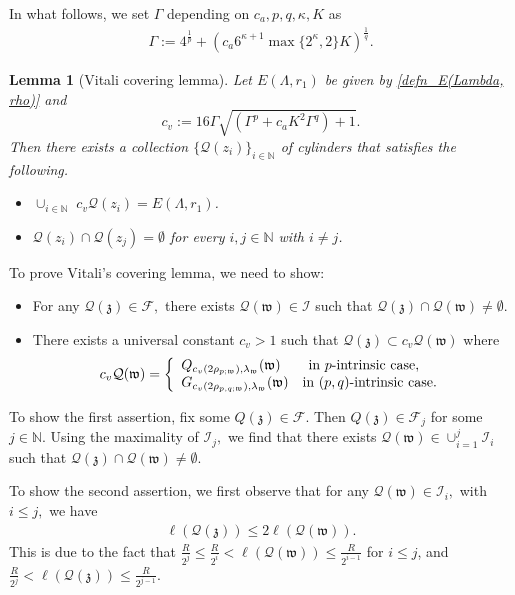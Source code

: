\documentclass[notitlepage,11pt,reqno]{amsart}
\newtheorem{lemma}[theorem]{Lemma}
\theoremstyle{definition}
\numberwithin{equation}{section}
\newcommand{\mcf}{\mathcal{F}}
\newcommand{\La}{\Lambda}
\newcommand{\NN}{\mathds{N}}
\begin{document}
In what follows, we set $\Gamma$ depending on $c_a, p, q, \kappa, K$ as 
\begin{align*}
   \Gamma:= 4^{\frac{1}{p}}+\left(c_a6^{\kappa+1}\max\{2^{\kappa}, 2\}K\right)^{\frac{1}{q}}.
\end{align*}
\begin{lemma}[Vitali covering lemma]\label{vitali lemma}
 Let $E(\Lambda, r_1)$ be given by \eqref{defn_E(Lambda, rho)} and $$c_v:= 16\Gamma \sqrt{(\Gamma^p+c_aK^2 \Gamma^q)+1}.$$ Then there exists a collection $\{\mathcal{Q}({z_i})\}_{i\in \NN}$ of cylinders that satisfies the following.
\begin{itemize}
\item [(i)] $\cup_{i\in\NN}\,\,c_v \mathcal{Q}({z_i})=E(\La, r_1)$.
\item[(ii)] $\mathcal{Q}({z_i})\cap \mathcal{Q}({z_j})= \emptyset$ for every $i,j\in \NN$ with $i\ne j$.
\end{itemize}   
\end{lemma}
To prove Vitali's covering lemma, we need to show:
\begin{itemize}
\item[(i)] For any $\mathcal{Q}(\mathfrak{z}) \in \mcf,$ there exists $\mathcal{Q}(\mathfrak{w}) \in \mathcal{I}$ such that $\mathcal{Q}(\mathfrak{z}) \cap \mathcal{Q}(\mathfrak{w}) \neq \emptyset.$
\item[(ii)] There exists a universal constant $c_v>1$ such that $\mathcal{Q}(\mathfrak{z}) \subset c_v \mathcal{Q}(\mathfrak{w})$ where 
$$
c_v\mathcal{Q}(\mathfrak{w})=\left\{
    \begin{array}{l c}
        Q_{c_v(2\rho_{p;\mathfrak{w}}),\lambda_\mathfrak{w}}(\mathfrak{w})\,\,\,\,\,\, \quad \text{in $p$-intrinsic case},\\
        G_{c_v(2\rho_{p,q;\mathfrak{w}}),\lambda_\mathfrak{w}}(\mathfrak{w}) \quad \text{in $(p,q)$-intrinsic case}.
    \end{array}
    \right.
$$
\end{itemize}
To show the first assertion, fix some $Q(\mathfrak{z}) \in \mcf.$ Then $Q(\mathfrak{z}) \in \mcf_j$ for some $j \in \NN.$ Using the maximality of $\mathcal{I}_j,$ we find that there exists $\mathcal{Q}(\mathfrak{w})\in \cup_{i=1}^{j}\mathcal{I}_i$ such that $\mathcal{Q}(\mathfrak{z})\cap \mathcal{Q}(\mathfrak{w})\neq \emptyset.$ 

To show the second assertion, we first observe that for any $\mathcal{Q}(\mathfrak{w}) \in \mathcal{I}_i,$ with $i\leq j,$ we have
\begin{align}\label{radius compare}
    \ell(\mathcal{Q}(\mathfrak{z}))\leq 2\ell(\mathcal{Q}(\mathfrak{w})).
\end{align}
This is due to the fact that
$\frac{R}{2^j}\leq \frac{R}{2^i}<\ell(\mathcal Q(\mathfrak w)) \leq \frac{R}{2^{i-1}}$ for $i\leq j$, and $\frac{R}{2^j}<\ell(\mathcal Q(\mathfrak z)) \leq \frac{R}{2^{j-1}}$. 
\end{document}

